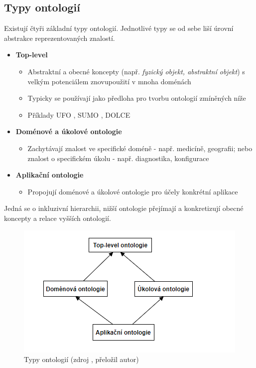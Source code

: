 \subsection{Typy ontologií}
Existují čtyři základní typy ontologií. Jednotlivé typy se od sebe liší úrovní abstrakce reprezentovaných znalostí. \cite{Stephan2007}\par
\begin{itemize}
\item \textbf{Top-level}
\begin{itemize}
\item Abstraktní a obecné koncepty (např. \textit{fyzický objekt, abstraktní objekt}) s velkým potenciálem znovupoužití v mnoha doménách
\item Typicky se používají jako předloha pro tvorbu ontologií zmíněných níže
\item Příklady UFO \cite{Guizzardi2005}, SUMO \cite{Niles:2001:TSU:505168.505170}, DOLCE \cite{Dolce}
\end{itemize}
\item \textbf{Doménové a úkolové ontologie}
\begin{itemize}
\item Zachytávají znalost ve specifické doméně - např. medicíně, geografii; nebo znalost o specifickém úkolu - např. diagnostika, konfigurace
\end{itemize}
\item \textbf{Aplikační ontologie}
\begin{itemize}
\item Propojují doménové a úkolové ontologie pro účely konkrétní aplikace
\end{itemize}
\end{itemize}
Jedná se o inkluzivní hierarchii, nižší ontologie přejímají a konkretizují obecné koncepty a relace vyšších ontologií. \cite{Stephan2007}
\begin{figure}[htbp!]
	\includegraphics[width=0.7\linewidth]{img/ontology_types.png}
	\caption{Typy ontologií (zdroj \cite{Stephan2007}, přeložil autor)}
	\label{fig:ontology_types}
\end{figure}


